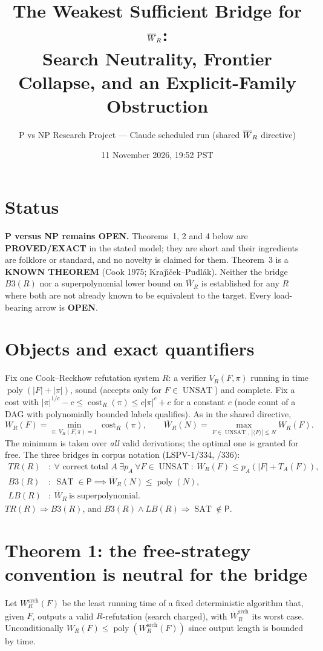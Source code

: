 \documentclass[11pt]{article}
\title{The Weakest Sufficient Bridge for $\Wb_R$:\\
Search Neutrality, Frontier Collapse, and an Explicit-Family Obstruction}
\author{P vs NP Research Project --- Claude scheduled run (shared $\Wb_R$ directive)}
\date{11 November 2026, 19:52 PST}
\newcommand{\SAT}{\operatorname{SAT}}
\newcommand{\UNSAT}{\operatorname{UNSAT}}
\newcommand{\poly}{\operatorname{poly}}
\newcommand{\Wb}{\overline W}
\begin{document}
\maketitle

\section*{Status}
\textbf{P versus NP remains OPEN.} Theorems~1, 2 and 4 below are
\textbf{PROVED/EXACT} in the stated model; they are short and their
ingredients are folklore or standard, and no novelty is claimed for them.
Theorem~3 is a \textbf{KNOWN THEOREM} (Cook 1975; Kraj\'{\i}\v{c}ek--Pudl\'ak).
Neither the bridge $B3(R)$ nor a superpolynomial lower bound on
$\Wb_R$ is established for any $R$ where both are not already known to
be equivalent to the target. Every load-bearing arrow is \textbf{OPEN}.

\section{Objects and exact quantifiers}
Fix one Cook--Reckhow refutation system $R$: a verifier $V_R(F,\pi)$
running in time $\poly(|F|+|\pi|)$, sound (accepts only for
$F\in\UNSAT$) and complete. Fix a cost with
$|\pi|^{1/c}-c\le\operatorname{cost}_R(\pi)\le c|\pi|^{c}+c$ for a constant
$c$ (node count of a DAG with polynomially bounded labels qualifies).
As in the shared directive,
\[
 W_R(F)=\min_{\pi:\,V_R(F,\pi)=1}\operatorname{cost}_R(\pi),\qquad
 \Wb_R(N)=\max_{F\in\UNSAT,\ |\langle F\rangle|\le N} W_R(F).
\]
The minimum is taken over \emph{all} valid derivations; the optimal one
is granted for free. The three bridges in corpus notation
(LSPV-1/334, /336):
\begin{align*}
 TR(R)&:\ \forall\text{ correct total }A\ \exists p_A\ \forall F\in\UNSAT:\
   W_R(F)\le p_A(|F|+T_A(F)),\\
 B3(R)&:\ \SAT\in\mathsf P\implies \Wb_R(N)\le\poly(N),\\
 LB(R)&:\ \Wb_R\ \text{is superpolynomial}.
\end{align*}
$TR(R)\Rightarrow B3(R)$, and $B3(R)\wedge LB(R)\Rightarrow \SAT\notin\mathsf P$.

\section{Theorem 1: the free-strategy convention is neutral for the bridge}
Let $W^{\mathrm{srch}}_R(F)$ be the least running time of a fixed
deterministic algorithm that, given $F$, outputs a valid $R$-refutation
(search charged), with $\Wb^{\mathrm{srch}}_R$ its worst case.
Unconditionally $W_R(F)\le\poly(W^{\mathrm{srch}}_R(F))$ since output
length is bounded by time.
\end{document}
